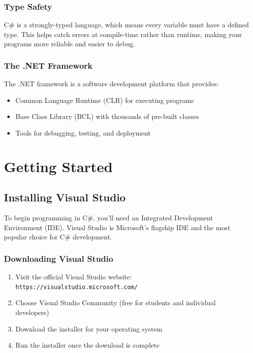 \documentclass{article}
\begin{document}
\subsubsection{Type Safety}
C\# is a strongly-typed language, which means every variable must have a defined type. This helps catch errors at compile-time rather than runtime, making your programs more reliable and easier to debug.

\subsubsection{The .NET Framework}
The .NET framework is a software development platform that provides:
\begin{itemize}
    \item Common Language Runtime (CLR) for executing programs
    \item Base Class Library (BCL) with thousands of pre-built classes
    \item Tools for debugging, testing, and deployment
\end{itemize}

\section{Getting Started}

\subsection{Installing Visual Studio}
To begin programming in C\#, you'll need an Integrated Development Environment (IDE). Visual Studio is Microsoft's flagship IDE and the most popular choice for C\# development.

\subsubsection{Downloading Visual Studio}
\begin{enumerate}
    \item Visit the official Visual Studio website: \texttt{https://visualstudio.microsoft.com/}
    \item Choose Visual Studio Community (free for students and individual developers)
    \item Download the installer for your operating system
    \item Run the installer once the download is complete
\end{enumerate}
\end{document}

